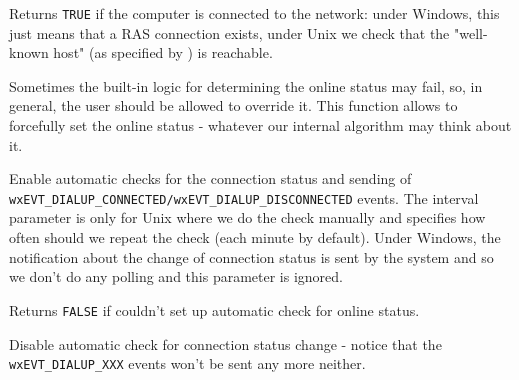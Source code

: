 \label{wxdialupmanagerisonline}


Returns {\tt TRUE} if the computer is connected to the network: under Windows,
this just means that a RAS connection exists, under Unix we check that
the "well-known host" (as specified by 
) is reachable.

\label{wxdialupmanagersetonlinestatus}


Sometimes the built-in logic for determining the online status may fail,
so, in general, the user should be allowed to override it. This function
allows to forcefully set the online status - whatever our internal
algorithm may think about it.



\label{wxdialupmanagerenableautocheckonlinestatus}


Enable automatic checks for the connection status and sending of 
{\tt wxEVT\_DIALUP\_CONNECTED/wxEVT\_DIALUP\_DISCONNECTED} events. The interval
parameter is only for Unix where we do the check manually and specifies how
often should we repeat the check (each minute by default). Under Windows, the
notification about the change of connection status is sent by the system and so
we don't do any polling and this parameter is ignored.

Returns {\tt FALSE} if couldn't set up automatic check for online status.

\label{wxdialupmanagerdisableautocheckonlinestatus}


Disable automatic check for connection status change - notice that the
{\tt wxEVT\_DIALUP\_XXX} events won't be sent any more neither.

\label{wxdialupmanagersetwellknownhost}


